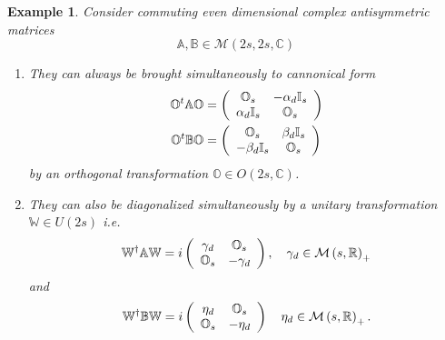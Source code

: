 \documentclass[aps,preprint]{revtex4}%
\newtheorem{example}[theorem]{Example}
\begin{document}
\begin{example}
Consider \emph{commuting} even dimensional complex antisymmetric matrices
\begin{equation}
\mathbb{A},\mathbb{B}\in\mathcal{M}\left(  2s,2s,\mathbb{C}\right)
\end{equation}


\begin{enumerate}
\item They can always be brought simultaneously to cannonical form
\begin{align}
\mathbb{O}^{t}\mathbb{AO}  &  =\left(
\begin{array}
[c]{cc}%
\mathbb{O}_{s} & -\mathbf{\alpha}_{d}\mathbb{I}_{s}\\
\mathbf{\alpha}_{d}\mathbb{I}_{s} & \mathbb{O}_{s}%
\end{array}
\right) \\
\mathbb{O}^{t}\mathbb{BO}  &  =\left(
\begin{array}
[c]{cc}%
\mathbb{O}_{s} & \mathbf{\beta}_{d}\mathbb{I}_{s}\\
-\mathbf{\beta}_{d}\mathbb{I}_{s} & \mathbb{O}_{s}%
\end{array}
\right)
\end{align}
by an orthogonal transformation $\mathbb{O}\in O\left(  2s,\mathbb{C}\right)
$.

\item They can also be diagonalized simultaneously by a unitary transformation
$\mathbb{W}\in U\left(  2s\right)  $ i.e.
\begin{equation}
\mathbb{W}^{\dagger}\mathbb{AW}=i\left(
\begin{array}
[c]{cc}%
\mathbf{\gamma}_{d} & \mathbb{O}_{s}\\
\mathbb{O}_{s} & -\mathbf{\gamma}_{d}%
\end{array}
\right)  ,\quad\mathbf{\gamma}_{d}\in\mathcal{M}\left(  s,\mathbb{R}\right)
_{+}%
\end{equation}
and
\begin{equation}
\mathbb{W}^{\dagger}\mathbb{BW}=i\left(
\begin{array}
[c]{cc}%
\mathbf{\eta}_{d} & \mathbb{O}_{s}\\
\mathbb{O}_{s} & -\mathbf{\eta}_{d}%
\end{array}
\right)  \quad\mathbf{\eta}_{d}\in\mathcal{M}\left(  s,\mathbb{R}\right)
_{+}.
\end{equation}



\end{enumerate}
\end{example}
\end{document}

